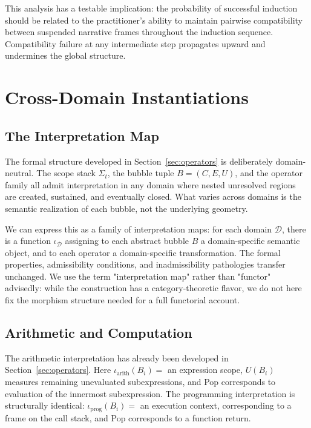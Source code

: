 \documentclass[12pt, a4paper]{article}
\theoremstyle{plain}
\theoremstyle{definition}
\theoremstyle{remark}
\begin{document}
This analysis has a testable implication: the probability of successful
induction should be related to the practitioner's ability to maintain
pairwise compatibility between suspended narrative frames throughout the
induction sequence. Compatibility failure at any intermediate step propagates
upward and undermines the global structure.


\section{Cross-Domain Instantiations}

\subsection{The Interpretation Map}

The formal structure developed in Section~\ref{sec:operators} is deliberately
domain-neutral. The scope stack $\Sigma_t$, the bubble tuple $B = (C, E, U)$,
and the operator family all admit interpretation in any domain where nested
unresolved regions are created, sustained, and eventually closed. What varies
across domains is the semantic realization of each bubble, not the underlying
geometry.

We can express this as a family of interpretation maps: for each domain $\mathcal{D}$,
there is a function $\iota_{\mathcal{D}}$ assigning to each abstract bubble
$B$ a domain-specific semantic object, and to each operator a domain-specific
transformation. The formal properties, admissibility conditions, and
inadmissibility pathologies transfer unchanged. We use the term "interpretation
map" rather than "functor" advisedly: while the construction has a
category-theoretic flavor, we do not here fix the morphism structure needed
for a full functorial account.

\subsection{Arithmetic and Computation}

The arithmetic interpretation has already been developed in
Section~\ref{sec:operators}. Here $\iota_{\text{arith}}(B_i) =$ an
expression scope, $U(B_i)$ measures remaining unevaluated subexpressions,
and Pop corresponds to evaluation of the innermost subexpression. The
programming interpretation is structurally identical: $\iota_{\text{prog}}(B_i)
=$ an execution context, corresponding to a frame on the call stack, and Pop
corresponds to a function return.
\end{document}
